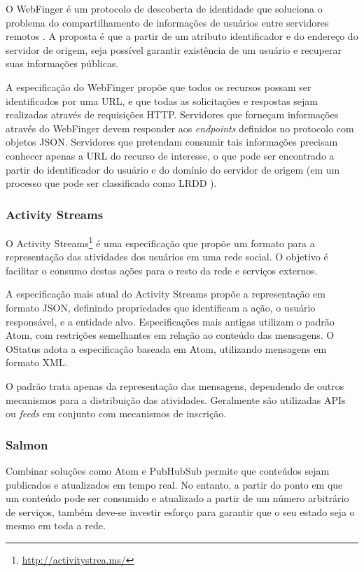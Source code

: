 O WebFinger é um protocolo de descoberta de identidade que soluciona o problema do
compartilhamento de informações de usuários entre servidores remotos \cite{rfc7033}.
A proposta é que a partir de um atributo identificador e do endereço do servidor de
origem, seja possível garantir existência de um usuário e recuperar suas informações
públicas.

A especificação do WebFinger propõe que todos os recursos possam ser identificados
por uma URL, e que todas as solicitações e respostas sejam realizadas através de
requisições HTTP. Servidores que forneçam informações através do WebFinger devem
responder aos \textit{endpoints} definidos no protocolo com objetos JSON. Servidores
que pretendam consumir tais informações precisam conhecer apenas a URL do recurso de
interesse, o que pode ser encontrado a partir do identificador do usuário e do
domínio do servidor de origem (em um processo que pode ser classificado como LRDD
\cite{lrdd2010}). 

\subsubsection{Activity Streams}

O Activity Streams\footnote{\url{http://activitystrea.ms/}} é uma especificação que
propõe um formato para a representação das atividades dos usuários em uma rede
social. O objetivo é facilitar o consumo destas ações para o resto da rede e
serviços externos.

A especificação mais atual do Activity Streams propõe a representação em formato
JSON, definindo propriedades que identificam a ação, o usuário responsável, e a
entidade alvo. Especificações mais antigas utilizam o padrão Atom, com restrições
semelhantes em relação ao conteúdo das mensagens. O OStatus adota a especificação
baseada em Atom, utilizando mensagens em formato XML.

O padrão trata apenas da representação das mensagens, dependendo de outros
mecanismos para a distribuição das atividades. Geralmente são utilizadas APIs ou
\textit{feeds} em conjunto com mecanismos de inscrição.

\subsubsection{Salmon}

Combinar soluções como Atom e PubHubSub permite que conteúdos sejam publicados e
atualizados em tempo real. No entanto, a partir do ponto em que um conteúdo pode ser
consumido e atualizado a partir de um número arbitrário de serviços, também deve-se
investir esforço para garantir que o seu estado seja o mesmo em toda a rede.

